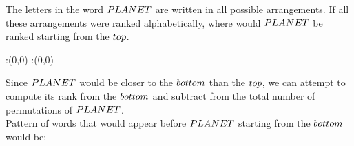 \question The letters in the word $PLANET$ are written in all possible 
arrangements. If all these arrangements were ranked alphabetically, where
would $PLANET$ be ranked starting from the $top$.

\insertQR{}

\watchout

\ifprintanswers
  \begin{marginfigure}
      :(0,0)
      :(0,0)
    \figdrawbegin{}
      \figdrawline [100,101]
    \figdrawend
    \figvisu{\figBoxA}{}{%
    }
    \centerline{\box\figBoxA}
  \end{marginfigure}
\fi 

\begin{solution}
  Since $PLANET$ would be closer to the $bottom$ than the $top$, 
  we can attempt to compute its rank from the $bottom$ and subtract 
  from the total number of permutations of $PLANET$. \\
  Pattern of words that would appear before $PLANET$ starting from the
  $bottom$
  would be:
  

\end{solution}
